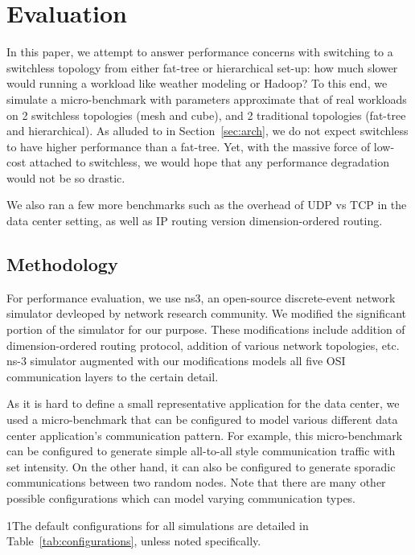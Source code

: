 \section{Evaluation}
\label{sec:eval}
In this paper, we attempt to answer performance concerns with switching to a switchless topology from either fat-tree or hierarchical set-up: how much slower would running a workload like weather modeling or Hadoop? To this end, we simulate a micro-benchmark with parameters approximate that of real workloads on 2 switchless topologies (mesh and cube), and 2 traditional topologies (fat-tree and hierarchical). As alluded to in Section~\ref{sec:arch}, we do not expect switchless to have higher performance than a fat-tree. Yet, with the massive force of low-cost attached to switchless, we would hope that any performance degradation would not be so drastic.

We also ran a few more benchmarks such as the overhead of UDP vs TCP in the data center setting, as well as IP routing version dimension-ordered routing.

\subsection {Methodology}
For performance evaluation, we use ns3\cite{Ns3:Online}, an open-source discrete-event network simulator devleoped by network research community. We modified the significant portion of the simulator for our purpose. These modifications include addition of dimension-ordered routing protocol, addition of various network topologies, etc. ns-3 simulator augmented with our modifications models all five OSI communication layers to the certain detail.

As it is hard to define a small representative application for the data center, we used a micro-benchmark that can be configured to model various different data center application's communication pattern. For example, this micro-benchmark can be configured to generate simple all-to-all style communication traffic with set intensity. On the other hand, it can also be configured to generate sporadic communications between two random nodes. Note that there are many other possible configurations which can model varying communication types.

1The default configurations for all simulations are detailed in Table~\ref{tab:configurations}, unless noted specifically.

